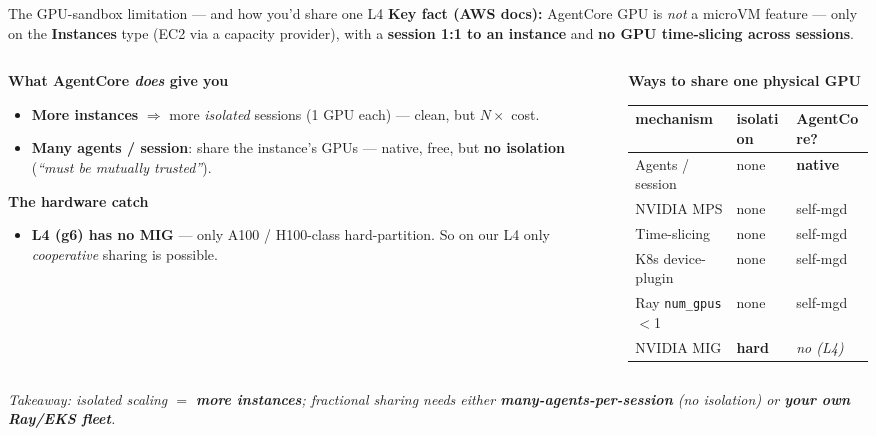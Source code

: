 \documentclass[aspectratio=169]{beamer}
\begin{document}
\begin{frame}{The GPU-sandbox limitation --- and how you'd share one L4}
  \footnotesize \textbf{Key fact (AWS docs):} AgentCore GPU is \emph{not} a microVM feature --- only on
  the \textbf{Instances} type (EC2 via a capacity provider), with a \textbf{session 1:1 to an instance}
  and \textbf{no GPU time-slicing across sessions}.
  \begin{columns}[T]
  \begin{column}{0.52\textwidth}
    \textbf{What AgentCore \emph{does} give you}
    \begin{itemize}\footnotesize
      \item \textbf{More instances} $\Rightarrow$ more \emph{isolated} sessions (1 GPU each) --- clean, but $N\times$ cost.
      \item \textbf{Many agents / session}: share the instance's GPUs --- native, free, but \textbf{no isolation} (\emph{``must be mutually trusted''}).
    \end{itemize}
    \textbf{The hardware catch}
    \begin{itemize}\footnotesize
      \item \textbf{L4 (g6) has no MIG} --- only A100 / H100-class hard-partition. So on our L4 only
        \emph{cooperative} sharing is possible.
    \end{itemize}
  \end{column}
  \begin{column}{0.48\textwidth}
    \textbf{Ways to share one physical GPU}
    \renewcommand{\arraystretch}{1.1}\scriptsize
    \begin{tabular}{@{}p{2.7cm}p{1.05cm}p{1.35cm}@{}}
      \toprule
      mechanism & isolation & AgentCore? \\
      \midrule
      Agents / session & none & \textbf{native} \\
      NVIDIA MPS & none & self-mgd \\
      Time-slicing & none & self-mgd \\
      K8s device-plugin & none & self-mgd \\
      Ray \texttt{num\_gpus}$<$1 & none & self-mgd \\
      NVIDIA MIG & \textbf{hard} & \emph{no (L4)} \\
      \bottomrule
    \end{tabular}
  \end{column}
  \end{columns}
  \vspace{0.2em}
  {\footnotesize\itshape Takeaway: isolated scaling $=$ \textbf{more instances}; fractional sharing
  needs either \textbf{many-agents-per-session} (no isolation) or \textbf{your own Ray/EKS fleet}.}
\end{frame}
\end{document}
